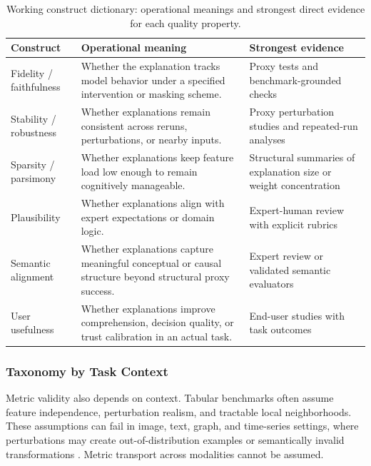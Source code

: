 \documentclass[10pt,a4paper,twoside]{article}
\begin{document}
\begin{table}[t]
\centering
\caption{Working construct dictionary: operational meanings and strongest
direct evidence for each quality property.}
\begin{tabularx}{\linewidth}{l X X}
\toprule
\textbf{Construct} & \textbf{Operational meaning} & \textbf{Strongest evidence} \\
\midrule
Fidelity / faithfulness & Whether the explanation tracks model behavior under a specified intervention or masking scheme. & Proxy tests and benchmark-grounded checks \\
Stability / robustness & Whether explanations remain consistent across reruns, perturbations, or nearby inputs. & Proxy perturbation studies and repeated-run analyses \\
Sparsity / parsimony & Whether explanations keep feature load low enough to remain cognitively manageable. & Structural summaries of explanation size or weight concentration \\
Plausibility & Whether explanations align with expert expectations or domain logic. & Expert-human review with explicit rubrics \\
Semantic alignment & Whether explanations capture meaningful conceptual or causal structure beyond structural proxy success. & Expert review or validated semantic evaluators \\
User usefulness & Whether explanations improve comprehension, decision quality, or trust calibration in an actual task. & End-user studies with task outcomes \\
\bottomrule
\end{tabularx}
\label{tab:constructs}
\end{table}

\subsubsection{Taxonomy by Task Context}

Metric validity also depends on context. Tabular benchmarks often assume
feature independence, perturbation realism, and tractable local
neighborhoods. These assumptions can fail in image, text, graph, and
time-series settings, where perturbations may create out-of-distribution
examples or semantically invalid transformations
\citep{agarwal2023gnn_eval,proszewska2025bxaic}. Metric transport across
modalities cannot be assumed.
\end{document}
